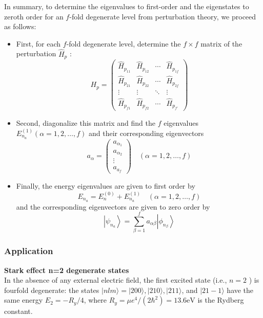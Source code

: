  In summary, to determine the eigenvalues to first-order and the eigenstates to zeroth order for an $f$-fold degenerate level from perturbation theory, we proceed as follows:
 \begin{itemize}
 	\item First, for each $f$-fold degenerate level, determine the $f \times f$ matrix of the perturbation $\hat{H}_{p}$ :
 	$$H_{p}=\left(\begin{array}{cccc}
 		\hat{H}_{p_{11}} & \hat{H}_{p_{12}} & \cdots & \hat{H}_{p_{1 f}} \\
 		\hat{H}_{p_{21}} & \hat{H}_{p_{22}} & \cdots & \hat{H}_{p_{2 f}} \\
 		\vdots & \vdots & \ddots & \vdots \\
 		\hat{H}_{p_{f 1}} & \hat{H}_{p_{f 2}} & \cdots & \hat{H}_{p_{f \prime}}
 	\end{array}\right)$$
 	\item Second, diagonalize this matrix and find the $f$ eigenvalues $E_{n_{a}}^{(1)}(\alpha=1,2, \ldots, f)$ and their corresponding eigenvectors\\
 	$$a_{\alpha}=\left(\begin{array}{c}
 		a_{\alpha_{1}} \\
 		a_{\alpha_{2}} \\
 		\vdots \\
 		a_{a_{f}}
 	\end{array}\right) \quad(\alpha=1,2, \ldots, f)$$
 	\item Finally, the energy eigenvalues are given to first order by
 	$$
 	E_{n_{a}}=E_{n}^{(0)}+E_{n_{a}}^{(1)} \quad(\alpha=1,2, \ldots, f)
 	$$
 	and the corresponding eigenvectors are given to zero order by
 	$$
 	\left|\psi_{n_{a}}\right\rangle=\sum_{\beta=1}^{f} a_{\alpha \beta}\left|\phi_{n_{\beta}}\right\rangle
 	$$
 \end{itemize}

\subsubsection{Application}
\textbf{Stark effect n=2 degenerate states}\\
In the absence of any external electric field, the first excited state (i.e., $n=2$ ) is fourfold degenerate: the states $|n l m\rangle=|200\rangle,|210\rangle,|211\rangle$, and $|21-1\rangle$ have the same energy $E_{2}=-R_{y} / 4$, where $R_{y}=\mu e^{4} /\left(2 \hbar^{2}\right)=13.6 \mathrm{eV}$ is the Rydberg constant.

